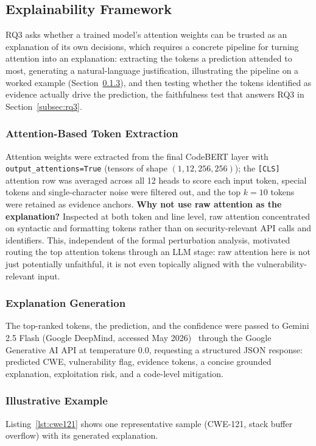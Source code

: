 \documentclass{ieeeaccess}
\begin{document}
\subsection{Explainability Framework}
\label{subsec:explainability}
RQ3 asks whether a trained model's attention weights can be trusted as an explanation of its own decisions, which requires a concrete pipeline for turning attention into an explanation: extracting the tokens a prediction attended to most, generating a natural-language justification, illustrating the pipeline on a worked example (Section~\ref{par:example}), and then testing whether the tokens identified as evidence actually drive the prediction, the faithfulness test that answers RQ3 in Section~\ref{subsec:rq3}.

\subsubsection{Attention-Based Token Extraction}
\label{par:token-extraction}
Attention weights were extracted from the final CodeBERT layer with \texttt{output\_attentions=True} (tensors of shape $(1,12,256,256)$); the \texttt{[CLS]} attention row was averaged across all 12 heads to score each input token, special tokens and single-character noise were filtered out, and the top $k=10$ tokens were retained as evidence anchors. \textbf{Why not use raw attention as the explanation?} Inspected at both token and line level, raw attention concentrated on syntactic and formatting tokens rather than on security-relevant API calls and identifiers. This, independent of the formal perturbation analysis, motivated routing the top attention tokens through an LLM stage: raw attention here is not just potentially unfaithful, it is not even topically aligned with the vulnerability-relevant input.

\subsubsection{Explanation Generation}
\label{par:explanation-gen}
The top-ranked tokens, the prediction, and the confidence were passed to Gemini 2.5 Flash (Google DeepMind, accessed May 2026)~\cite{ref29} through the Google Generative AI API at temperature 0.0, requesting a structured JSON response: predicted CWE, vulnerability flag, evidence tokens, a concise grounded explanation, exploitation risk, and a code-level mitigation.

\subsubsection{Illustrative Example}
\label{par:example}
Listing~\ref{lst:cwe121} shows one representative sample (CWE-121, stack buffer overflow) with its generated explanation.
\end{document}
